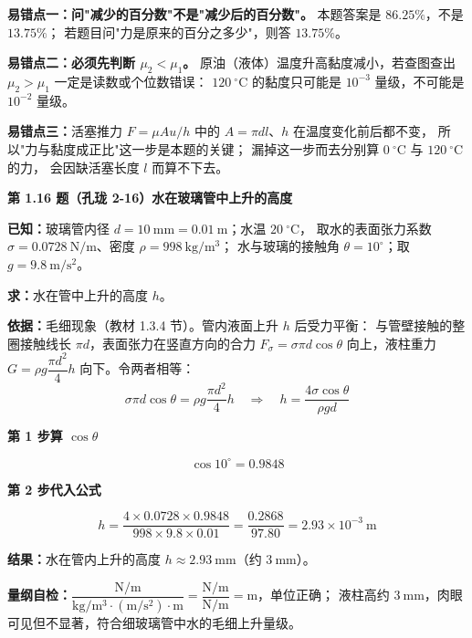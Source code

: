 \begin{yicuo}
\textbf{易错点一：问"减少的百分数"不是"减少后的百分数"。}
本题答案是 $86.25\%$，不是 $13.75\%$；
若题目问"力是原来的百分之多少"，则答 $13.75\%$。

\textbf{易错点二：必须先判断 $\mu_2<\mu_1$。}
原油（液体）温度升高黏度减小，若查图查出 $\mu_2>\mu_1$ 一定是读数或个位数错误：
$120\ ^{\circ}\mathrm{C}$ 的黏度只可能是 $10^{-3}$ 量级，不可能是 $10^{-2}$ 量级。

\textbf{易错点三：}活塞推力 $F=\mu Au/h$ 中的 $A=\pi d l$、$h$ 在温度变化前后都不变，
所以"力与黏度成正比"这一步是本题的关键；
漏掉这一步而去分别算 $0\ ^{\circ}\mathrm{C}$ 与 $120\ ^{\circ}\mathrm{C}$ 的力，
会因缺活塞长度 $l$ 而算不下去。
\end{yicuo}

\noindent\textbf{第 1.16 题（孔珑 2-16）\quad 水在玻璃管中上升的高度}

\begin{jie}
\textbf{已知：}玻璃管内径 $d=10\ \mathrm{mm}=0.01\ \mathrm{m}$；水温 $20\ ^{\circ}\mathrm{C}$，
取水的表面张力系数 $\sigma=0.0728\ \mathrm{N/m}$、密度 $\rho=998\ \mathrm{kg/m^3}$；
水与玻璃的接触角 $\theta=10^{\circ}$；取 $g=9.8\ \mathrm{m/s^2}$。

\textbf{求：}水在管中上升的高度 $h$。

\textbf{依据：}毛细现象（教材 1.3.4 节）。管内液面上升 $h$ 后受力平衡：
与管壁接触的整圈接触线长 $\pi d$，表面张力在竖直方向的合力
$F_{\sigma}=\sigma\pi d\cos\theta$ 向上，液柱重力
$G=\rho g\dfrac{\pi d^{2}}{4}h$ 向下。令两者相等：
\[ \sigma\pi d\cos\theta=\rho g\frac{\pi d^{2}}{4}h
   \quad\Longrightarrow\quad
   h=\frac{4\sigma\cos\theta}{\rho g d} \]

\textbf{第 1 步\quad 算 $\cos\theta$}

\[ \cos 10^{\circ}=0.9848 \]

\textbf{第 2 步\quad 代入公式}

\[ h=\frac{4\times0.0728\times0.9848}{998\times9.8\times0.01}
     =\frac{0.2868}{97.80}=2.93\times10^{-3}\ \mathrm{m} \]

\textbf{结果：}水在管内上升的高度 $h\approx2.93\ \mathrm{mm}$（约 $3\ \mathrm{mm}$）。

\textbf{量纲自检：}$\dfrac{\mathrm{N/m}}{\mathrm{kg/m^3}\cdot(\mathrm{m/s^2})\cdot\mathrm{m}}
=\dfrac{\mathrm{N/m}}{\mathrm{N/m}}=\mathrm{m}$，单位正确；
液柱高约 $3\ \mathrm{mm}$，肉眼可见但不显著，符合细玻璃管中水的毛细上升量级。
\end{jie}

